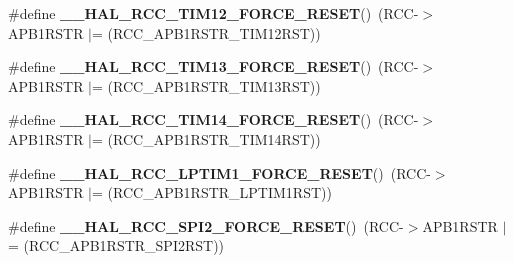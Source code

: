 \begin{DoxyCompactItemize}
\item 
\mbox{\label{group___r_c_c_ex___force___release___peripheral___reset_ga1c4fa1efafbaad1e9ac513412df04f21}} 
\#define {\bfseries \+\_\+\+\_\+\+H\+A\+L\+\_\+\+R\+C\+C\+\_\+\+T\+I\+M12\+\_\+\+F\+O\+R\+C\+E\+\_\+\+R\+E\+S\+ET}()~(R\+CC-\/$>$A\+P\+B1\+R\+S\+TR $\vert$= (R\+C\+C\+\_\+\+A\+P\+B1\+R\+S\+T\+R\+\_\+\+T\+I\+M12\+R\+ST))
\item 
\mbox{\label{group___r_c_c_ex___force___release___peripheral___reset_gac3ec3222d8441040695cb64a7be91026}} 
\#define {\bfseries \+\_\+\+\_\+\+H\+A\+L\+\_\+\+R\+C\+C\+\_\+\+T\+I\+M13\+\_\+\+F\+O\+R\+C\+E\+\_\+\+R\+E\+S\+ET}()~(R\+CC-\/$>$A\+P\+B1\+R\+S\+TR $\vert$= (R\+C\+C\+\_\+\+A\+P\+B1\+R\+S\+T\+R\+\_\+\+T\+I\+M13\+R\+ST))
\item 
\mbox{\label{group___r_c_c_ex___force___release___peripheral___reset_gaee5b3b45c9e419c7dc2815fea8ca131f}} 
\#define {\bfseries \+\_\+\+\_\+\+H\+A\+L\+\_\+\+R\+C\+C\+\_\+\+T\+I\+M14\+\_\+\+F\+O\+R\+C\+E\+\_\+\+R\+E\+S\+ET}()~(R\+CC-\/$>$A\+P\+B1\+R\+S\+TR $\vert$= (R\+C\+C\+\_\+\+A\+P\+B1\+R\+S\+T\+R\+\_\+\+T\+I\+M14\+R\+ST))
\item 
\mbox{\label{group___r_c_c_ex___force___release___peripheral___reset_ga76cc40a6695938f9b0fb602a68a4ac31}} 
\#define {\bfseries \+\_\+\+\_\+\+H\+A\+L\+\_\+\+R\+C\+C\+\_\+\+L\+P\+T\+I\+M1\+\_\+\+F\+O\+R\+C\+E\+\_\+\+R\+E\+S\+ET}()~(R\+CC-\/$>$A\+P\+B1\+R\+S\+TR $\vert$= (R\+C\+C\+\_\+\+A\+P\+B1\+R\+S\+T\+R\+\_\+\+L\+P\+T\+I\+M1\+R\+ST))
\item 
\mbox{\label{group___r_c_c_ex___force___release___peripheral___reset_ga869e4f5c1132e3dfce084099cf454c51}} 
\#define {\bfseries \+\_\+\+\_\+\+H\+A\+L\+\_\+\+R\+C\+C\+\_\+\+S\+P\+I2\+\_\+\+F\+O\+R\+C\+E\+\_\+\+R\+E\+S\+ET}()~(R\+CC-\/$>$A\+P\+B1\+R\+S\+TR $\vert$= (R\+C\+C\+\_\+\+A\+P\+B1\+R\+S\+T\+R\+\_\+\+S\+P\+I2\+R\+ST))
\item 
\mbox{\label{group___r_c_c_ex___force___release___peripheral___reset_gafb0c679992eba330a2d47ac722a5c143}} 

\end{DoxyCompactItemize}
